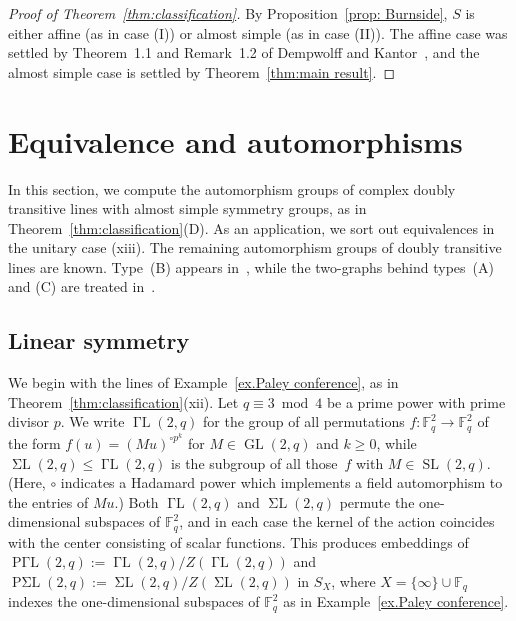 \begin{proof}[Proof of Theorem~\ref{thm:classification}]
By Proposition~\ref{prop: Burnside}, $S$ is either affine (as in case (I)) or almost simple (as in case (II)).
The affine case was settled by Theorem~1.1 and Remark~1.2 of Dempwolff and Kantor~\cite{DempwolffK:23}, and the almost simple case is settled by Theorem~\ref{thm:main result}.
\end{proof}




\section{Equivalence and automorphisms}
\label{sec: equivalence}
In this section, we compute the automorphism groups of complex doubly transitive lines with almost simple symmetry groups, as in Theorem~\ref{thm:classification}(D).
As an application, we sort out equivalences in the unitary case (xiii).
The remaining automorphism groups of doubly transitive lines are known.
Type~(B) appears in~\cite{DempwolffK:23}, while the two-graphs behind types~(A) and (C) are treated in~\cite{Taylor:92}.


\subsection{Linear symmetry}
We begin with the lines of Example~\ref{ex.Paley conference}, as in Theorem~\ref{thm:classification}(xii).
Let $q\equiv 3 \bmod 4$ be a prime power with prime divisor $p$.
We write $\operatorname{\text{$\Gamma$}L}(2,q)$ for the group of all permutations $f\colon \mathbb{F}_q^2 \to \mathbb{F}_q^2$ of the form $f(u) = (Mu)^{\circ p^k}$ for $M \in \operatorname{GL}(2,q)$ and $k \geq 0$, while $\operatorname{\text{$\Sigma$}L}(2,q) \leq \operatorname{\text{$\Gamma$}L}(2,q)$ is the subgroup of all those~$f$ with $M \in \operatorname{SL}(2,q)$.
(Here, $\circ$ indicates a Hadamard power which implements a field automorphism to the entries of $Mu$.)
Both $\operatorname{\text{$\Gamma$}L}(2,q)$ and $\operatorname{\text{$\Sigma$}L}(2,q)$ permute the one-dimensional subspaces of $\mathbb{F}_q^2$, and in each case the kernel of the action coincides with the center consisting of scalar functions.
This produces embeddings of $\operatorname{P\text{$\Gamma$}L}(2,q):= \operatorname{\text{$\Gamma$}L}(2,q) / Z(\operatorname{\text{$\Gamma$}L}(2,q))$ and $\operatorname{P\text{$\Sigma$}L}(2,q):= \operatorname{\text{$\Sigma$}L}(2,q) / Z(\operatorname{\text{$\Sigma$}L}(2,q))$ in $S_X$, where $X= \{\infty\} \cup \mathbb{F}_q$ indexes the one-dimensional subspaces of $\mathbb{F}_q^2$ as in Example~\ref{ex.Paley conference}.


